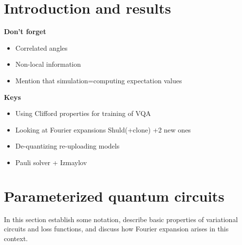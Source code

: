 \documentclass[twocolumn, amsfonts, amssymb, aps, nofootinbib]{revtex4-2}
\begin{document}
\maketitle

\tableofcontents

\section{Introduction and results}
\textbf{Don't forget}
\begin{itemize}
	\item Correlated angles
	\item Non-local information
	\item Mention that simulation=computing expectation values
\end{itemize}
\textbf{Keys}
\begin{itemize}
	\item Using Clifford properties for training of VQA
	\item Looking at Fourier expansions Shuld(+clone) +2 new ones
	\item De-quantizing re-uploading models
	\item Pauli solver + Izmaylov
\end{itemize}
\cite{Ryabinkin2020}
\section{Parameterized quantum circuits} \label{sec VQA}
In this section establish some notation, describe basic properties of variational circuits and loss functions, and discuss how Fourier expansion arises in this context.
\end{document}
